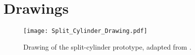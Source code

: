 \section{Drawings}\label{app:C}
\begin{figure}[H]
\centering
\texttt{[image: Split\_Cylinder\_Drawing.pdf]}
\caption{Drawing of the split-cylinder prototype, adapted from \cite{janezic}.}
\end{figure}